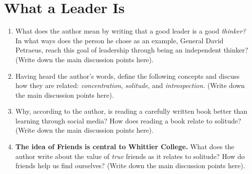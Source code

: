 \documentclass{article}
\begin{document}
\section{What a Leader Is}

\begin{enumerate}
\item What does the author mean by writing that a good leader is a good \textit{thinker?}  In what ways does the person he chose as an example, General David Petraeus, reach this goal of leadership through being an independent thinker?  (Write down the main discussion points here). \\ \vspace{2.5cm}
\item Having heard the author's words, define the following concepts and discuss how they are related: \textit{concentration}, \textit{solitude}, and \textit{introspection.} (Write down the main discussion points here). \\ \vspace{3cm}
\item Why, according to the author, is reading a carefully written book better than learning through social media? How does reading a book relate to solitude?  (Write down the main discussion points here).  \\ \vspace{3cm}
\item \textbf{The idea of Friends is central to Whittier College.}  What does the author write about the value of \textit{true} friends as it relates to solitude?  How do friends help us find ourselves? (Write down the main discussion points here). \\ \vspace{3cm}
\end{enumerate}
\end{document}
